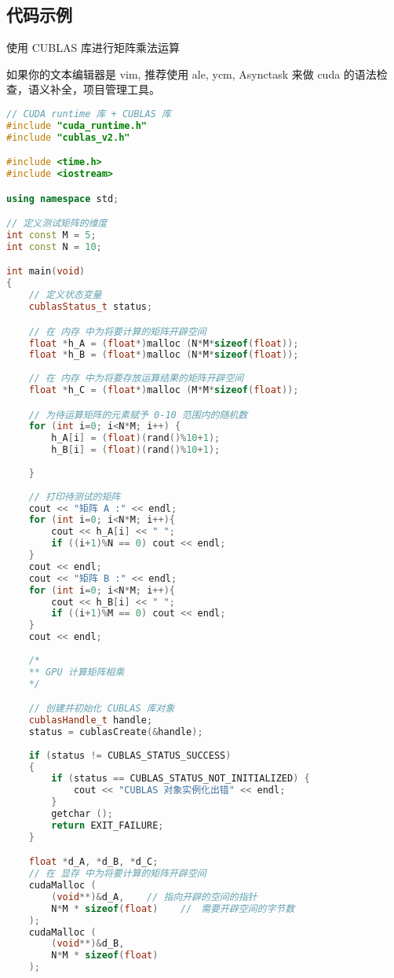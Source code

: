 \subsection{代码示例}%

使用 CUBLAS 库进行矩阵乘法运算

如果你的文本编辑器是 vim, 推荐使用 ale, ycm, Asynctask 来做 cuda 的语法检查，语义补全，项目管理工具。
\begin{lstlisting}[language=cpp, caption=cublas\_demo.cu]
// CUDA runtime 库 + CUBLAS 库 
#include "cuda_runtime.h"
#include "cublas_v2.h"

#include <time.h>
#include <iostream>

using namespace std;

// 定义测试矩阵的维度
int const M = 5;
int const N = 10;

int main(void) 
{   
    // 定义状态变量
    cublasStatus_t status;

    // 在 内存 中为将要计算的矩阵开辟空间
    float *h_A = (float*)malloc (N*M*sizeof(float));
    float *h_B = (float*)malloc (N*M*sizeof(float));
    
    // 在 内存 中为将要存放运算结果的矩阵开辟空间
    float *h_C = (float*)malloc (M*M*sizeof(float));

    // 为待运算矩阵的元素赋予 0-10 范围内的随机数
    for (int i=0; i<N*M; i++) {
        h_A[i] = (float)(rand()%10+1);
        h_B[i] = (float)(rand()%10+1);
    
    }
    
    // 打印待测试的矩阵
    cout << "矩阵 A :" << endl;
    for (int i=0; i<N*M; i++){
        cout << h_A[i] << " ";
        if ((i+1)%N == 0) cout << endl;
    }
    cout << endl;
    cout << "矩阵 B :" << endl;
    for (int i=0; i<N*M; i++){
        cout << h_B[i] << " ";
        if ((i+1)%M == 0) cout << endl;
    }
    cout << endl;
    
    /*
    ** GPU 计算矩阵相乘
    */

    // 创建并初始化 CUBLAS 库对象
    cublasHandle_t handle;
    status = cublasCreate(&handle);
    
    if (status != CUBLAS_STATUS_SUCCESS)
    {
        if (status == CUBLAS_STATUS_NOT_INITIALIZED) {
            cout << "CUBLAS 对象实例化出错" << endl;
        }
        getchar ();
        return EXIT_FAILURE;
    }

    float *d_A, *d_B, *d_C;
    // 在 显存 中为将要计算的矩阵开辟空间
    cudaMalloc (
        (void**)&d_A,    // 指向开辟的空间的指针
        N*M * sizeof(float)    //　需要开辟空间的字节数
    );
    cudaMalloc (
        (void**)&d_B,    
        N*M * sizeof(float)    
    );


\end{lstlisting}
